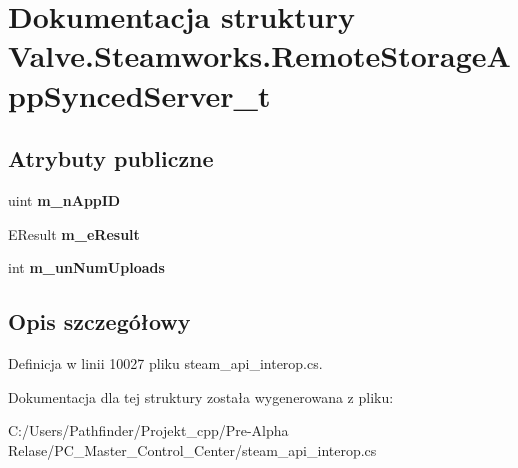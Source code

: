 \hypertarget{struct_valve_1_1_steamworks_1_1_remote_storage_app_synced_server__t}{}\section{Dokumentacja struktury Valve.\+Steamworks.\+Remote\+Storage\+App\+Synced\+Server\+\_\+t}
\label{struct_valve_1_1_steamworks_1_1_remote_storage_app_synced_server__t}
\subsection*{Atrybuty publiczne}
\begin{DoxyCompactItemize}
\item 
\mbox{\label{struct_valve_1_1_steamworks_1_1_remote_storage_app_synced_server__t_a214b906501a62699f359b30528614b03}} 
uint {\bfseries m\+\_\+n\+App\+ID}
\item 
\mbox{\label{struct_valve_1_1_steamworks_1_1_remote_storage_app_synced_server__t_a1bcf46e9b3b96582aa9fbbf64b6270ea}} 
E\+Result {\bfseries m\+\_\+e\+Result}
\item 
\mbox{\label{struct_valve_1_1_steamworks_1_1_remote_storage_app_synced_server__t_aa7e0f80e4fdb1f9b534a2e2e16fc6e70}} 
int {\bfseries m\+\_\+un\+Num\+Uploads}
\end{DoxyCompactItemize}


\subsection{Opis szczegółowy}


Definicja w linii 10027 pliku steam\+\_\+api\+\_\+interop.\+cs.



Dokumentacja dla tej struktury została wygenerowana z pliku\+:\begin{DoxyCompactItemize}
\item 
C\+:/\+Users/\+Pathfinder/\+Projekt\+\_\+cpp/\+Pre-\/\+Alpha Relase/\+P\+C\+\_\+\+Master\+\_\+\+Control\+\_\+\+Center/steam\+\_\+api\+\_\+interop.\+cs\end{DoxyCompactItemize}
